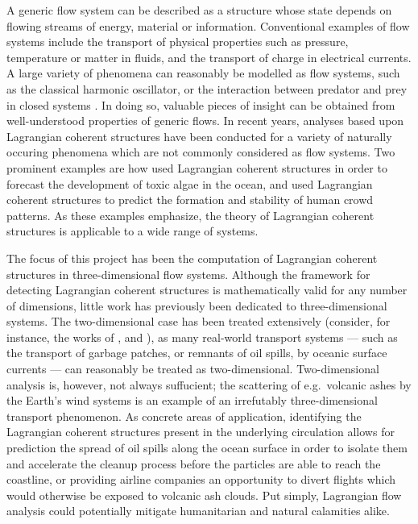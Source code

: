 A generic flow system can be described as a structure whose state depends on
flowing streams of energy, material or information. Conventional examples of
flow systems include the transport of physical properties such as pressure,
temperature or matter in fluids, and the transport of charge in electrical
currents. A large variety of phenomena can reasonably be modelled as flow
systems, such as the classical harmonic oscillator, or the interaction between
predator and prey in closed systems
\parencite[parts I--II]{strogatz2014nonlinear}. In doing so, valuable pieces
of insight can be obtained from well-understood properties of generic flows.
In recent years, analyses based upon Lagrangian coherent structures have been
conducted for a variety of naturally occuring phenomena which are not
commonly considered as flow systems. Two prominent examples are how
\textcite{olascoaga2008tracing} used Lagrangian coherent structures in order
to forecast the development of toxic algae in the ocean, and
\textcite{ali2007lagrangian} used Lagrangian coherent structures to predict
the formation and stability of human crowd patterns. As these examples
emphasize, the theory of Lagrangian coherent structures is applicable to a
wide range of systems.

The focus of this project has been the computation of Lagrangian coherent
structures in three-dimensional flow systems. Although the framework for
detecting Lagrangian coherent structures is mathematically valid for any number
of dimensions, little work has previously been dedicated to three-dimensional
systems. The two-dimensional case has been treated extensively (consider, for
instance, the works of \textcite{onu2015lcstool},
\textcite{farazmand2012computing} and \textcite{haller2000lagrangian}), as many
real-world transport systems --- such as the transport of garbage patches, or
remnants of oil spills, by oceanic surface currents --- can reasonably be
treated as two-dimensional. Two-dimensional analysis is, however, not always
suffucient; the scattering of e.g.\ volcanic ashes by the Earth's wind systems
is an example of an irrefutably three-dimensional transport phenomenon.
As concrete areas of application, identifying the Lagrangian coherent
structures present in the underlying circulation allows for prediction the
spread of oil spills along the ocean surface in order to isolate them and
accelerate the cleanup process before the particles are able to reach the
coastline, or providing airline companies an opportunity to divert flights
which would otherwise be exposed to volcanic ash clouds. Put simply, Lagrangian
flow analysis could potentially mitigate humanitarian and natural calamities
alike.

